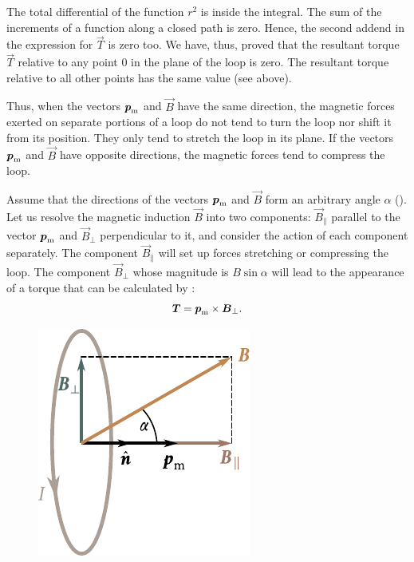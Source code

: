\noindent
The total differential of the function $r^2$ is inside the integral. The sum of the increments of a function along a closed path is zero. Hence, the second addend in the expression for $\vec{T}$ is zero too. We have, thus, proved that the resultant torque $\vec{T}$ relative to any point $0$ in the plane of the loop is zero. The resultant torque relative to all other points has the same value (see above).

Thus, when the vectors $\boldsymbol{p}_{\text{m}}$ and $\vec{B}$ have the same direction, the magnetic forces exerted on separate portions of a loop do not tend to turn the loop nor shift it from its position. They only tend to stretch the loop in its plane. If the vectors $\boldsymbol{p}_{\text{m}}$ and $\vec{B}$ have opposite directions, the magnetic forces tend to compress the loop.

Assume that the directions of the vectors $\boldsymbol{p}_{\text{m}}$ and $\vec{B}$ form an arbitrary angle $\alpha$ (). Let us resolve the magnetic induction $\vec{B}$ into two components: $\vec{B}_{\parallel}$ parallel to the vector $\boldsymbol{p}_{\text{m}}$ and $\vec{B}_{\perp}$ perpendicular
to it, and consider the action of each component separately. The component $\vec{B}_{\parallel}$ will set up forces stretching or compressing the loop. The component $\vec{B}_{\perp}$ whose magnitude is $B\sin\alpha$ will lead to the appearance of a torque that can be calculated by :
\begin{equation*}
    \boldsymbol{T} = \boldsymbol{p}_{\text{m}} \times \boldsymbol{B}_{\perp}.
\end{equation*}

\begin{figure}[t]
	\begin{center}
		\includegraphics[scale=1]{figures/ch_06/fig_6_16.pdf}
		\caption[]{}
		\label{fig:6_16}
	\end{center}
	\vspace{-0.8cm}
\end{figure}

